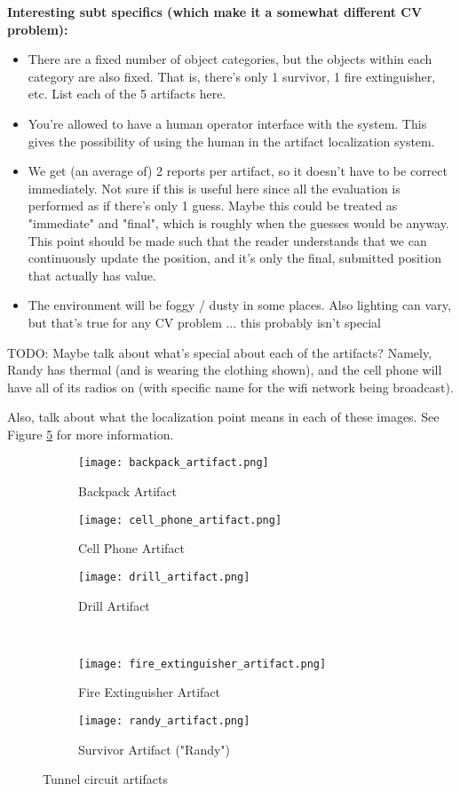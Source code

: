 \textbf{Interesting subt specifics (which make it a somewhat different CV problem):}
\begin{itemize}
	\item There are a fixed number of object categories, but the objects within each category are also fixed. That is, there's only 1 survivor, 1 fire extinguisher, etc. List each of the 5 artifacts here.
	\item You're allowed to have a human operator interface with the system. This gives the possibility of using the human in the artifact localization system.
	\item We get (an average of) 2 reports per artifact, so it doesn't have to be correct immediately. Not sure if this is useful here since all the evaluation is performed as if there's only 1 guess. Maybe this could be treated as "immediate" and "final", which is roughly when the guesses would be anyway. This point should be made such that the reader understands that we can continuously update the position, and it's only the final, submitted position that actually has value.
	\item The environment will be foggy / dusty in some places. Also lighting can vary, but that's true for any CV problem ... this probably isn't special
\end{itemize}

TODO: Maybe talk about what's special about each of the artifacts? Namely, Randy has thermal (and is wearing the clothing shown), and the cell phone will have all of its radios on (with specific name for the wifi network being broadcast).

Also, talk about what the localization point means in each of these images. See Figure \ref{randy} for more information.

\begin{figure}
	\centering
	\begin{subfigure}{0.3\textwidth}
		\texttt{[image: backpack\_artifact.png]}
		\caption{Backpack Artifact}
		\label{backpack}		
	\end{subfigure}
	\hfill
	\begin{subfigure}{0.3\textwidth}
		\texttt{[image: cell\_phone\_artifact.png]}
		\caption{Cell Phone Artifact}
		\label{cell phone}
	\end{subfigure}	
	\hfill
	\begin{subfigure}{0.3\textwidth}
		\texttt{[image: drill\_artifact.png]}
		\caption{Drill Artifact}
		\label{drill}
	\end{subfigure}
	\\
	\begin{subfigure}{0.45\textwidth}
		\texttt{[image: fire\_extinguisher\_artifact.png]}
		\caption{Fire Extinguisher Artifact}
		\label{fire extinguisher}
	\end{subfigure}	
	\hfill
	\begin{subfigure}{0.45\textwidth}
		\texttt{[image: randy\_artifact.png]}
		\caption{Survivor Artifact ("Randy")}
		\label{randy}
	\end{subfigure}	
	\caption{Tunnel circuit artifacts}
	\label{tunnel artifacts}
\end{figure}

